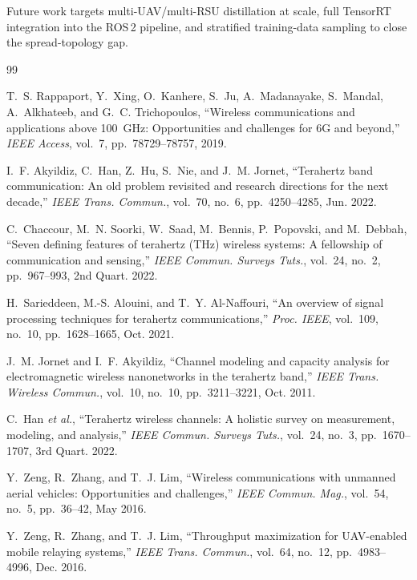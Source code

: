 \documentclass[journal]{IEEEtran}
\begin{document}
Future work targets multi-UAV/multi-RSU distillation at scale, full TensorRT integration into the ROS\,2 pipeline, and stratified training-data sampling to close the spread-topology gap.


\balance


\begin{thebibliography}{99}

T.~S. Rappaport, Y.~Xing, O.~Kanhere, S.~Ju, A.~Madanayake, S.~Mandal, A.~Alkhateeb, and G.~C. Trichopoulos, ``Wireless communications and applications above 100~GHz: Opportunities and challenges for 6G and beyond,'' \textit{IEEE Access}, vol.~7, pp.~78729--78757, 2019.

I.~F. Akyildiz, C.~Han, Z.~Hu, S.~Nie, and J.~M. Jornet, ``Terahertz band communication: An old problem revisited and research directions for the next decade,'' \textit{IEEE Trans. Commun.}, vol.~70, no.~6, pp.~4250--4285, Jun. 2022.

C.~Chaccour, M.~N. Soorki, W.~Saad, M.~Bennis, P.~Popovski, and M.~Debbah, ``Seven defining features of terahertz (THz) wireless systems: A fellowship of communication and sensing,'' \textit{IEEE Commun. Surveys Tuts.}, vol.~24, no.~2, pp.~967--993, 2nd Quart. 2022.

H.~Sarieddeen, M.-S. Alouini, and T.~Y. Al-Naffouri, ``An overview of signal processing techniques for terahertz communications,'' \textit{Proc. IEEE}, vol.~109, no.~10, pp.~1628--1665, Oct. 2021.

J.~M. Jornet and I.~F. Akyildiz, ``Channel modeling and capacity analysis for electromagnetic wireless nanonetworks in the terahertz band,'' \textit{IEEE Trans. Wireless Commun.}, vol.~10, no.~10, pp.~3211--3221, Oct. 2011.

C.~Han \textit{et al.}, ``Terahertz wireless channels: A holistic survey on measurement, modeling, and analysis,'' \textit{IEEE Commun. Surveys Tuts.}, vol.~24, no.~3, pp.~1670--1707, 3rd Quart. 2022.

Y.~Zeng, R.~Zhang, and T.~J. Lim, ``Wireless communications with unmanned aerial vehicles: Opportunities and challenges,'' \textit{IEEE Commun. Mag.}, vol.~54, no.~5, pp.~36--42, May 2016.

Y.~Zeng, R.~Zhang, and T.~J. Lim, ``Throughput maximization for UAV-enabled mobile relaying systems,'' \textit{IEEE Trans. Commun.}, vol.~64, no.~12, pp.~4983--4996, Dec. 2016.


\end{thebibliography}
\end{document}
